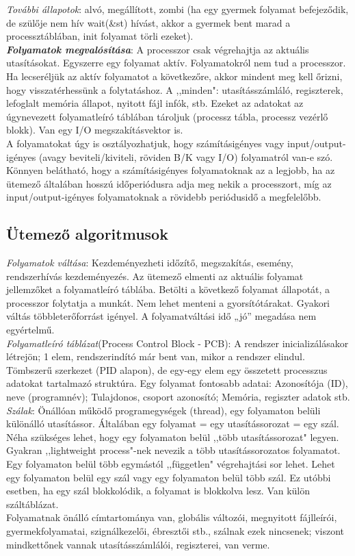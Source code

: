 \documentclass[margin=0px]{article}
\begin{document}
	\textit{További állapotok}: alvó, megállított, zombi (ha egy gyermek folyamat befejeződik, de szülője nem hív wait(\&st) hívást, akkor a gyermek bent marad a processztáblában, init folyamat törli ezeket). \\
	\textit{\textbf{Folyamatok megvalósítása}}: A processzor csak végrehajtja az aktuális utasításokat. Egyszerre egy folyamat aktív. Folyamatokról nem tud a processzor. Ha lecseréljük az aktív folyamatot a következőre, akkor mindent meg kell őrizni, hogy visszatérhessünk a folytatáshoz. A ,,minden": utasításszámláló, regiszterek, lefoglalt memória állapot, nyitott fájl infók, stb. Ezeket az adatokat az úgynevezett folyamatleíró táblában tároljuk (processz tábla, processz vezérlő blokk). Van egy I/O megszakításvektor is. \\
	A folyamatokat úgy is osztályozhatjuk, hogy számításigényes vagy input/output-igényes (avagy beviteli/kiviteli, röviden B/K vagy I/O) folyamatról van-e szó. Könnyen belátható, hogy a számításigényes folyamatoknak az a legjobb, ha az ütemező általában hosszú időperiódusra adja meg nekik a processzort, míg az input/output-igényes folyamatoknak a rövidebb periódusidő a megfelelőbb.
	
	\subsection{Ütemező algoritmusok}
	
	\textit{Folyamatok váltása}: Kezdeményezheti időzítő, megszakítás, esemény, rendszerhívás kezdeményezés. Az ütemező elmenti az aktuális folyamat jellemzőket a folyamatleíró táblába. Betölti a következő folyamat állapotát, a processzor folytatja a munkát. Nem lehet menteni a gyorsítótárakat. Gyakori váltás többleterőforrást igényel. A folyamatváltási idő „jó” megadása nem egyértelmű. \\
	\textit{Folyamatleíró táblázat}(Process Control Block - PCB): A rendszer inicializálásakor létrejön; 1 elem, rendszerindító már bent van, mikor a rendszer elindul. Tömbszerű szerkezet (PID alapon), de egy-egy elem egy összetett processzus adatokat tartalmazó struktúra. Egy folyamat fontosabb adatai: Azonosítója (ID), neve (programnév); Tulajdonos, csoport azonosító; Memória, regiszter adatok stb. \\
	\textit{Szálak}: Önállóan működő programegységek (thread), egy folyamaton belüli különálló utasítássor. Általában egy folyamat = egy utasítássorozat = egy szál. Néha szükséges lehet, hogy egy folyamaton belül ,,több utasítássorozat" legyen. Gyakran ,,lightweight process"-nek nevezik a több utasítássorozatos folyamatot. Egy folyamaton belül több egymástól ,,független" végrehajtási sor lehet. Lehet egy folyamaton belül egy szál vagy egy folyamaton belül több szál. Ez utóbbi esetben, ha egy szál blokkolódik, a folyamat is blokkolva lesz. Van külön száltáblázat. \\
	Folyamatnak önálló címtartománya van, globális változói, megnyitott fájlleírói, gyermekfolyamatai, szignálkezelői, ébresztői stb., szálnak ezek nincsenek; viszont mindkettőnek vannak utasításszámlálói, regiszterei, van verme. \\ \\
	
\end{document}
